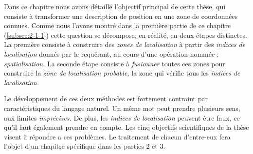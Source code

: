 Dans ce chapitre nous avons détaillé l'objectif principal de cette
thèse, qui consiste à transformer une description de position en une
zone de coordonnées connues. Comme nous l'avons montré dans la
première partie de ce chapitre (\ref{subsec:2-1-1}) cette question se
décompose, en réalité, en deux étapes distinctes. La première consiste
à construire des \emph{zones de localisation} à partir des
\emph{indices de localisation} donnés par le requérant, au cours d'une
opération nommée : \emph{spatialisation.} La seconde étape consiste à
\emph{fusionner} toutes ces zones pour construire la \emph{zone de
  localisation probable,} \ie la zone qui vérifie tous les
\emph{indices de localisation.}

Le développement de ces deux méthodes est fortement contraint par
caractéristiques du langage naturel. Un même mot peut prendre
plusieurs sens, aux limites \emph{imprécises.} De plus, les
\emph{indices de localisation} peuvent être faux, ce qu'il faut
également prendre en compte. Les cinq objectifs scientifiques de la
thèse visent à répondre a ces problèmes. Le traitement de chacun
d'entre-eux fera l'objet d'un chapitre spécifique dans les parties 2
et 3.

